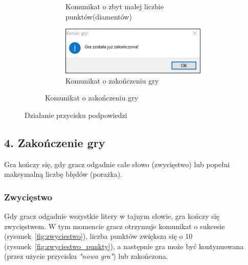 \documentclass[]{report}
\begin{document}
\begin{figure}[h]
\begin{subfigure}{0.4\textwidth}
\begin{subfigure}{0.4\textheight}
			\caption{Komunikat o zbyt małej liczbie punktów(diamentów)}
			\label{fig:za_malo_diamentow}
			\vspace{2cm}
		\end{subfigure}
		\vspace{2cm} %
		\begin{subfigure}{0.4\textheight}
			\centering
			\includegraphics[width=0.8\linewidth]{koniec_gry}
			\caption{Komunikat o zakończeniu gry}
			\label{fig:koniec_gry}
		\end{subfigure}
	\end{subfigure}
	\caption{Działanie przycisku podpowiedzi}
	\label{fig:Podpowiedz}
\end{figure}

\subsection*{4. Zakończenie gry}

Gra kończy się, gdy gracz odgadnie całe słowo (zwycięstwo) lub popełni maksymalną liczbę błędów (porażka).

\subsubsection*{Zwycięstwo}

Gdy gracz odgadnie wszystkie litery w tajnym słowie, gra kończy się zwycięstwem. W tym momencie gracz otrzymuje komunikat o sukcesie (rysunek~\ref{fig:zwyciestwo}), liczba punktów zwiększa się o 10 (rysunek~\ref{fig:zwyciestwo_punkty}), a następnie gra może być kontynuowana (przez użycie przycisku \textit{"nowa gra"}) lub zakończona.
\end{document}
